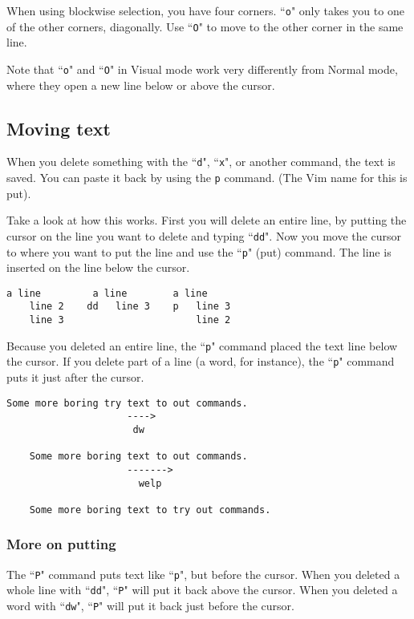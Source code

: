 When using blockwise selection, you have four corners.
``\texttt{o}" only takes you to one of the other corners, diagonally.
Use ``\texttt{O}" to move to the other corner in the same line.

Note that ``\texttt{o}" and ``\texttt{O}" in Visual mode work very differently from Normal mode, where they open a new line below or above the cursor.

\subsection{Moving text}

When you delete something with the ``\texttt{d}", ``\texttt{x}", or another command, the text is saved.
You can paste it back by using the \texttt{p} command.
(The Vim name for this is put).

Take a look at how this works.
First you will delete an entire line, by putting the cursor on the line you want to delete and typing ``\texttt{dd}".
Now you move the cursor to where you want to put the line and use the ``\texttt{p}" (put) command.
The line is inserted on the line below the cursor.

\begin{Verbatim}[samepage=true]
    a line         a line        a line
    line 2    dd   line 3    p   line 3
    line 3                       line 2
\end{Verbatim}

Because you deleted an entire line, the ``\texttt{p}" command placed the text line below the cursor.
If you delete part of a line (a word, for instance), the ``\texttt{p}" command puts it just after the cursor.

\begin{Verbatim}[samepage=true]
    Some more boring try text to out commands. 
                     ---->
                      dw

    Some more boring text to out commands. 
                     ------->
                       welp

    Some more boring text to try out commands. 
\end{Verbatim}

\subsubsection{More on putting}

The ``\texttt{P}" command puts text like ``\texttt{p}", but before the cursor.
When you deleted a whole line with ``\texttt{dd}", ``\texttt{P}" will put it back above the cursor.
When you deleted a word with ``\texttt{dw}", ``\texttt{P}" will put it back just before the cursor.

